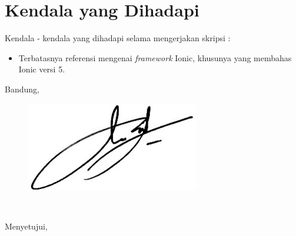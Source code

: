 \documentclass[a4paper,twoside]{article}
\begin{document}
\section{Kendala yang Dihadapi}
Kendala - kendala yang dihadapi selama mengerjakan skripsi :
\begin{itemize}
	\item Terbatasnya referensi mengenai \textit{framework} Ionic, khusunya yang membahas Ionic versi 5.
\end{itemize}

\vspace{1cm}
\centering Bandung, \tanggal\\
\vspace{0cm} 
\begin{figure}[H]
     \centering
    \includegraphics[scale=1]{TandaTangan.jpg}
\end{figure}

\nama \\ 
\vspace{1cm}

Menyetujui, \\
\end{document}
